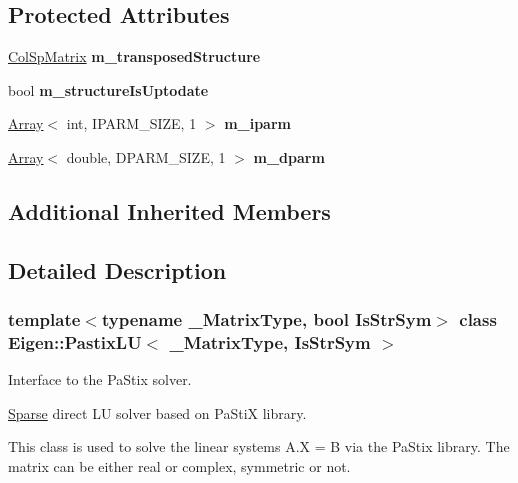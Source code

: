 \subsection*{Protected Attributes}
\begin{DoxyCompactItemize}
\item 
\mbox{\label{class_eigen_1_1_pastix_l_u_adabc5f2985161038c22285816c21ed87}} 
\mbox{\hyperlink{class_eigen_1_1_sparse_matrix}{Col\+Sp\+Matrix}} {\bfseries m\+\_\+transposed\+Structure}
\item 
\mbox{\label{class_eigen_1_1_pastix_l_u_adbb1af75943a3e0a5155481144533113}} 
bool {\bfseries m\+\_\+structure\+Is\+Uptodate}
\item 
\mbox{\label{class_eigen_1_1_pastix_l_u_a5cdb7299e33d7f089d9e38f191aed9b9}} 
\mbox{\hyperlink{class_eigen_1_1_array}{Array}}$<$ int, I\+P\+A\+R\+M\+\_\+\+S\+I\+ZE, 1 $>$ {\bfseries m\+\_\+iparm}
\item 
\mbox{\label{class_eigen_1_1_pastix_l_u_a139ba50ba94931769c328fa7c373a180}} 
\mbox{\hyperlink{class_eigen_1_1_array}{Array}}$<$ double, D\+P\+A\+R\+M\+\_\+\+S\+I\+ZE, 1 $>$ {\bfseries m\+\_\+dparm}
\end{DoxyCompactItemize}
\subsection*{Additional Inherited Members}


\subsection{Detailed Description}
\subsubsection*{template$<$typename \+\_\+\+Matrix\+Type, bool Is\+Str\+Sym$>$\newline
class Eigen\+::\+Pastix\+L\+U$<$ \+\_\+\+Matrix\+Type, Is\+Str\+Sym $>$}

Interface to the Pa\+Stix solver. 

\mbox{\hyperlink{struct_eigen_1_1_sparse}{Sparse}} direct LU solver based on Pa\+StiX library.

This class is used to solve the linear systems A.\+X = B via the Pa\+Stix library. The matrix can be either real or complex, symmetric or not.

